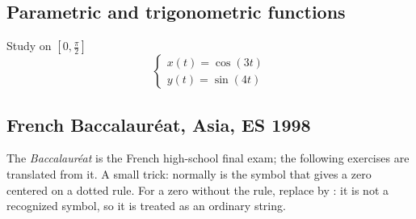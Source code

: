  \begin{tkzexample}[vbox]
\end{tkzexample}

\subsection{Parametric and trigonometric functions}
 

Study on $\left[0, \frac{\pi}{2}\right]$
 \begin{equation*}
\left\{%
\begin{array}{l}
 x(t) = \cos(3t)\\
 y(t) = \sin(4t)
\end{array}\right.
\end{equation*}

\begin{tkzexample}
\end{tkzexample}


\subsection{French Baccalauréat, Asia, ES 1998}
The \emph{Baccalauréat} is the French high-school final exam; the following exercises are translated from it. A small trick: normally  is the symbol that gives a zero centered on a dotted rule. For a zero without the rule, replace  by : it is not a recognized symbol, so it is treated as an ordinary string.


